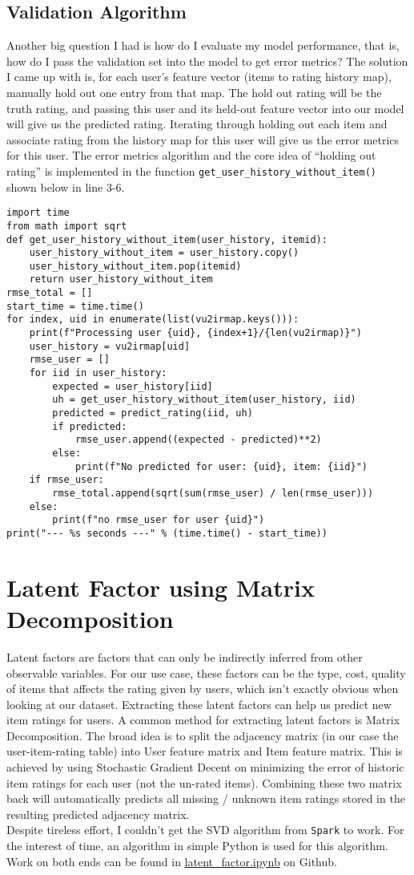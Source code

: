 \documentclass{scrartcl}
\begin{document}
\subsection{Validation Algorithm}
Another big question I had is how do I evaluate my model performance, that is, how do I pass the validation set into the model to get error metrics? The solution I came up with is, for each user's feature vector (items to rating history map), manually hold out one entry from that map. The hold out rating will be the truth rating, and passing this user and its held-out feature vector into our model will give us the predicted rating. Iterating through holding out each item and associate rating from the history map for this user will give us the error metrics for this user. The error metrics algorithm and the core idea of ``holding out rating'' is implemented in the function \texttt{get\_user\_history\_without\_item()} shown below in line 3-6.
\begin{lstlisting}
import time
from math import sqrt
def get_user_history_without_item(user_history, itemid):
    user_history_without_item = user_history.copy()
    user_history_without_item.pop(itemid)
    return user_history_without_item
rmse_total = []
start_time = time.time()
for index, uid in enumerate(list(vu2irmap.keys())):
    print(f"Processing user {uid}, {index+1}/{len(vu2irmap)}")
    user_history = vu2irmap[uid]
    rmse_user = []
    for iid in user_history:
        expected = user_history[iid]
        uh = get_user_history_without_item(user_history, iid)
        predicted = predict_rating(iid, uh)
        if predicted:
            rmse_user.append((expected - predicted)**2)
        else:
            print(f"No predicted for user: {uid}, item: {iid}")
    if rmse_user:
        rmse_total.append(sqrt(sum(rmse_user) / len(rmse_user)))
    else:
        print(f"no rmse_user for user {uid}")
print("--- %s seconds ---" % (time.time() - start_time))
\end{lstlisting}
\section{Latent Factor using Matrix Decomposition}
Latent factors are factors that can only be indirectly inferred from other observable variables. For our use case, these factors can be the type, cost, quality of items that affects the rating given by users, which isn't exactly obvious when looking at our dataset. Extracting these latent factors can help us predict new item ratings for users. A common method for extracting latent factors is Matrix Decomposition. The broad idea is to split the adjacency matrix (in our case the user-item-rating table) into User feature matrix and Item feature matrix. This is achieved by using Stochastic Gradient Decent on minimizing the error of historic item ratings for each user (not the un-rated items). Combining these two matrix back will automatically predicts all missing / unknown item ratings stored in the resulting predicted adjacency matrix. \\
Despite tireless effort, I couldn't get the SVD algorithm from \texttt{Spark} to work. For the interest of time, an algorithm in simple Python is used for this algorithm. Work on both ends can be found in \href{}{latent\_factor.ipynb} on Github.
\end{document}
